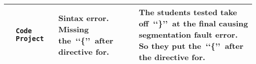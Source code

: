 \begin{table}[ht]
\begin{tabular}{|>{\centering\arraybackslash} m{.2cm}|>{\centering\arraybackslash} m{1.7cm}|  >{\centering\arraybackslash} m{2.75cm}|>{\centering\arraybackslash} m{2.75cm} |}
\begin{minipage}[m]{0.02\columnwidth}%
\centering
3
\end{minipage}&
\begin{minipage}[t]{0.22\columnwidth}%
\texttt{Code Project~\cite{CodeProject}}
\end{minipage}&
\begin{minipage}[t]{0.33\columnwidth}%
Sintax error. Missing the~\lq\lq\{\rq\rq~after directive for.
\end{minipage}&
\begin{minipage}[t]{0.33\columnwidth}%
The students tested take off~\lq\lq\}\rq\rq~at the final causing segmentation fault error.
So they put the~\lq\lq\{\rq\rq~after the directive for.
\end{minipage}
\tabularnewline
\hline


\end{tabular}
\end{table}
